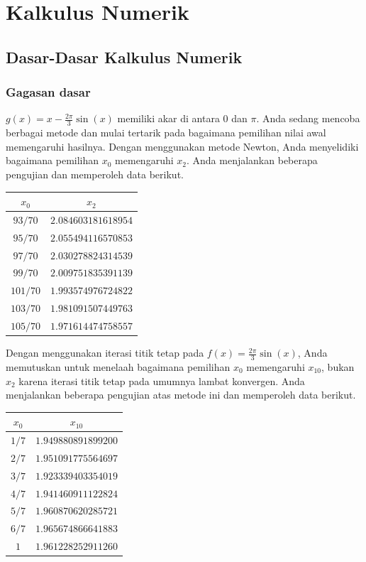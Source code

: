 
\chapter{Kalkulus Numerik\label{chap:Numerical-Calculus}}

\section{\label{sec:NumericalRudiments}Dasar-Dasar Kalkulus Numerik}

\subsection{Gagasan dasar}

$g(x)=x-\frac{2\pi}{3}\sin(x)$ memiliki akar di antara $0$ dan $\pi$.
Anda sedang mencoba berbagai metode dan mulai tertarik pada bagaimana
pemilihan nilai awal memengaruhi hasilnya. Dengan menggunakan metode
Newton, Anda menyelidiki bagaimana pemilihan $x_{0}$ memengaruhi
$x_{2}$. Anda menjalankan beberapa pengujian dan memperoleh data
berikut.

\begin{center}
\begin{tabular}{c|c}
$x_{0}$ & $x_{2}$\tabularnewline
\hline 
$93/70$ & $2.084603181618954$\tabularnewline
$95/70$ & $2.055494116570853$\tabularnewline
$97/70$ & $2.030278824314539$\tabularnewline
$99/70$ & $2.009751835391139$\tabularnewline
$101/70$ & $1.993574976724822$\tabularnewline
$103/70$ & $1.981091507449763$\tabularnewline
$105/70$ & $1.971614474758557$\tabularnewline
\end{tabular}
\par\end{center}

\noindent Dengan menggunakan iterasi titik tetap pada $f(x)=\frac{2\pi}{3}\sin(x)$,
Anda memutuskan untuk menelaah bagaimana pemilihan $x_{0}$ memengaruhi
$x_{10}$, bukan $x_{2}$ karena iterasi titik tetap pada umumnya
lambat konvergen. Anda menjalankan beberapa pengujian atas metode
ini dan memperoleh data berikut.

\begin{center}
\begin{tabular}{c|c}
$x_{0}$ & $x_{10}$\tabularnewline
\hline 
$1/7$ & $1.949880891899200$\tabularnewline
$2/7$ & $1.951091775564697$\tabularnewline
$3/7$ & $1.923339403354019$\tabularnewline
$4/7$ & $1.941460911122824$\tabularnewline
$5/7$ & $1.960870620285721$\tabularnewline
$6/7$ & $1.965674866641883$\tabularnewline
$1$ & $1.961228252911260$\tabularnewline
\end{tabular}
\par\end{center}

